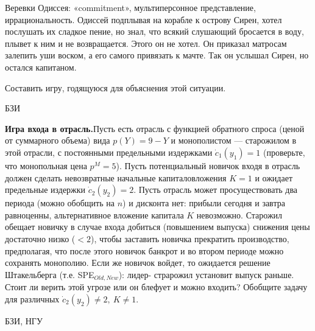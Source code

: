 \begin{problem}
 {\rm Веревки Одиссея: «commitment», мультиперсонное
представление, иррациональность.} Одиссей подплывая на
корабле к острову Сирен, хотел послушать их сладкое пение,
но знал, что всякий слушающий бросается в воду, плывет к
ним и не возвращается. Этого он не хотел. Он приказал
матросам залепить уши воском, а его самого привязать к
мачте. Так он услышал Сирен, но остался капитаном.

Составить  игру, годящуюся для объяснения этой ситуации.



\begin{source}
БЗИ
\end{source}


\begin{sol}

\end{sol}
\end{problem}




\begin{problem}
 {\bf Игра входа в отрасль.}\rm Пусть есть отрасль с
функцией обратного спроса (ценой от суммарного объема) вида
$p(Y)=9-Y$ и монополистом — старожилом в этой отрасли, с
постоянными предельными издержками $\dot{c}_1(y_1)=1$
(проверьте, что монопольная цена $p^M=5$). Пусть
потенциальный новичок входя в отрасль должен сделать
невозвратные начальные капиталовложения $K=1$ и ожидает
предельные издержки $\dot{c}_2(y_2)=2$. Пусть отрасль может
просуществовать два периода (можно обобщить на $n$) и
дисконта нет: прибыли сегодня и завтра равноценны,
альтернативное вложение капитала $K$ невозможно. Старожил
обещает новичку в случае входа добиться (повышением
выпуска) снижения цены достаточно низко ($<2$), чтобы
заставить новичка прекратить производство, предполагая, что
после этого новичок банкрот и во втором периоде можно
сохранять монополию. Если же новичок войдет, то ожидается
решение Штакельберга (т.е. SPE$_{Old,New}$): лидер-
страрожил установит выпуск раньше. Стоит ли верить этой
угрозе или он блефует и можно входить? Обобщите задачу для
различных $\dot{c}_2(y_2)\neq 2, ~K\neq 1$.



\begin{source}
БЗИ, НГУ
\end{source}


\begin{sol}

\end{sol}
\end{problem}




